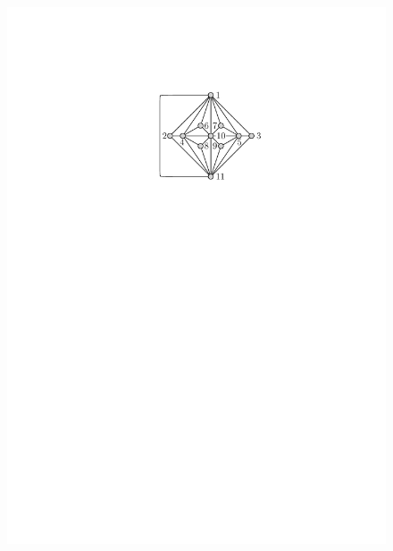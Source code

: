 \documentclass[runningheads]{llncs}
\begin{document}
\begin{figure}[t]
	\centering
	{\includegraphics[scale=0.86,page=4]{graphs}}
	\hfil

\end{figure}
\end{document}
